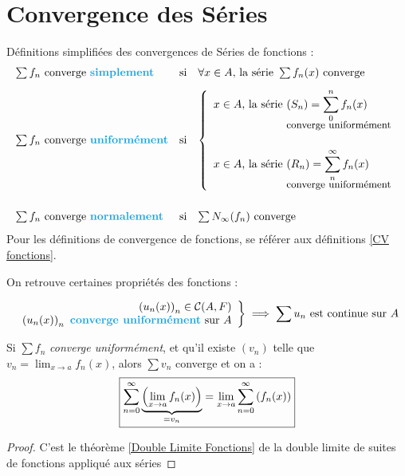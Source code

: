\documentclass[11pt,a4paper,fleqn,pdftex]{report}
\begin{document}
\section{Convergence des Séries}
\begin{dfn}
Définitions simplifiées des convergences de Séries de fonctions :\\
\begin{equation}\label{CV Serie}
\begin{array}{l c l}
\sum{f_n}\text{ converge \emph{simplement}}&\text{si}&\forall{}x\in{}A\text{, la série } \sum{f_n(x)} \text{ converge}\\[0.3cm]
\sum{f_n}\text{ converge \emph{uniformément}}&\text{si}&
\left\lbrace 
\begin{array}{l}
\begin{split}
x\in{}A\text{, la série } &(S_n)=\displaystyle\sum_0^n{f_n(x)}\\[-2mm] &\text{{\small  converge uniformément}}\end{split}\\[1cm]  
\begin{split}
x\in{}A\text{, la série } &(R_n)=\displaystyle\sum_n^\infty{f_n(x)}\\[-2mm] &\text{\small converge uniformément}\end{split}\\
\end{array}
\right. \\[2cm]
\sum{f_n}\text{ converge \emph{normalement}}&\text{si}&\sum{N_\infty (f_n)}\text{ converge}
\end{array}
\end{equation}
Pour les définitions de convergence de fonctions, se référer aux définitions \ref{CV fonctions}.
\end{dfn}
On retrouve certaines propriétés des fonctions :
\begin{theorem}

\[
\left.
\begin{array}{r}
\left(u_n(x)\right)_{n}\in\mathcal{C}(A,F)\\
\left(u_n(x)\right)_n \text{ \emph{converge uniformément} sur }A\\
\end{array}\right\rbrace \implies \sum u_n \text{ est continue sur }A\\
\]
\end{theorem}
\begin{itheorem}
Si $\sum f_n$ \emph{converge uniformément}, et qu'il existe $(v_n)$ telle que $v_n=\displaystyle\lim_{x\to a}f_n(x)$, alors $\sum v_n$ converge et on a :
\[\boxed{\sum^\infty_{n=0}\underbrace{\left(\lim_{x\to a} f_n(x)\right)}_{\mathclap{=v_n}}=\lim_{x\to a}\sum_{n=0}^\infty\left(f_n(x)\right)} \]
\end{itheorem}
\begin{proof}
C'est le théorème \ref{Double Limite Fonctions} de la double limite de suites de fonctions appliqué aux séries
\end{proof}
\end{document}
